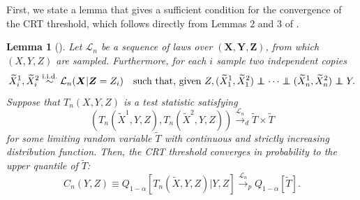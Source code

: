 \documentclass[12pt]{article}
\newtheorem{lemma}{Lemma}
\theoremstyle{definition}
\theoremstyle{remark}
\def\independenT#1#2{\mathrel{\rlap{$#1#2$}\mkern2mu{#1#2}}}
\newcommand\independent{\protect\mathpalette{\protect\independenT}{\perp}}
\newcommand{\prx}{\bm X}
\newcommand{\srx}{X}
\newcommand{\prz}{\bm Z}
\newcommand{\srz}{Z}
\newcommand{\srxk}{\widetilde X}
\newcommand{\pry}{{\bm Y}}
\newcommand{\sry}{Y}
\begin{document}
First, we state a lemma that gives a sufficient condition for the convergence of the CRT threshold, which follows directly from  Lemmas 2 and 3 of \cite{Wang2020b}.
\begin{lemma}[\cite{Wang2020b}] \label{lem:lucas}
	Let $\mathcal L_n$ be a sequence of laws over $(\prx,\pry,\prz)$, from which $(\srx,\sry,\srz)$ are sampled. Furthermore, for each $i$ sample two independent copies
	\begin{equation}
		\srxk_i^1,\srxk_i^2 \overset{\text{i.i.d.}}\sim \mathcal L_n(\prx|\prz = \srz_i) \quad \text{such that, given } \srz,  (\srxk_1^1,\srxk_1^2) \independent \cdots \independent (\srxk_n^1,\srxk_n^2) \independent \sry.
		\label{eq:two-resamples}
	\end{equation}
	Suppose that $T_n(\srx,\sry,\srz)$ is a test statistic satisfying 
	\begin{equation}
		(T_n(\srxk^1,\sry,\srz), T_n(\srxk^2, \sry,\srz)) \overset{\mathcal L_n}\rightarrow_d  \widetilde T \times \widetilde T
	\end{equation}
	for some limiting random variable $\widetilde T$ with continuous and strictly increasing distribution function. Then, the CRT threshold converges in probability to the upper quantile of $\widetilde T$:
	\begin{equation}
		C_n(\sry, \srz) \equiv Q_{1-\alpha}[T_n(\srxk,\sry,\srz)|\sry,\srz]  \overset{\mathcal L_n}\rightarrow_p Q_{1-\alpha}[\widetilde T].
	\end{equation}
	
\end{lemma}
\end{document}
